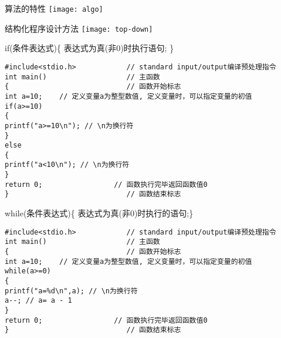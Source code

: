 
\begin{frame}{算法的特性}
\texttt{[image: algo]}
\end{frame}

\begin{frame}{结构化程序设计方法}
\texttt{[image: top-down]}
\end{frame}



\begin{frame}[fragile]{if(条件表达式)\{ 表达式为真(非0)时执行语句; \}}
\begin{lstlisting}
#include<stdio.h>            // standard input/output编译预处理指令
int main()                   // 主函数
{                            // 函数开始标志
int a=10;    // 定义变量a为整型数值, 定义变量时，可以指定变量的初值
if(a>=10)
{
printf("a>=10\n"); // \n为换行符
}
else
{
printf("a<10\n"); // \n为换行符
}
return 0;                 // 函数执行完毕返回函数值0
}                            // 函数结束标志
\end{lstlisting}
\end{frame}

\begin{frame}[fragile]{while(条件表达式)\{ 表达式为真(非0)时执行的语句;\}}
\begin{lstlisting}
#include<stdio.h>            // standard input/output编译预处理指令
int main()                   // 主函数
{                            // 函数开始标志
int a=10;    // 定义变量a为整型数值, 定义变量时，可以指定变量的初值
while(a>=0)
{
printf("a=%d\n",a); // \n为换行符
a--; // a= a - 1
}
return 0;                 // 函数执行完毕返回函数值0
}                            // 函数结束标志
\end{lstlisting}
\end{frame}


